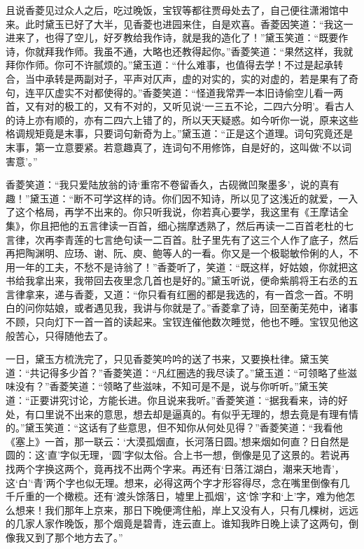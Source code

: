 且说香菱见过众人之后，吃过晚饭，宝钗等都往贾母处去了，自己便往潇湘馆中来。此时黛玉已好了大半，见香菱也进园来住，自是欢喜。香菱因笑道：“我这一进来了，也得了空儿，好歹教给我作诗，就是我的造化了！”黛玉笑道：“既要作诗，你就拜我作师。我虽不通，大略也还教得起你。”香菱笑道：“果然这样，我就拜你作师。你可不许腻烦的。”黛玉道：“什么难事，也值得去学！不过是起承转合，当中承转是两副对子，平声对仄声，虚的对实的，实的对虚的，若是果有了奇句，连平仄虚实不对都使得的。”香菱笑道：“怪道我常弄一本旧诗偷空儿看一两首，又有对的极工的，又有不对的，又听见说‘一三五不论，二四六分明’。看古人的诗上亦有顺的，亦有二四六上错了的，所以天天疑惑。如今听你一说，原来这些格调规矩竟是末事，只要词句新奇为上。”黛玉道：“正是这个道理。词句究竟还是末事，第一立意要紧。若意趣真了，连词句不用修饰，自是好的，这叫做‘不以词害意’。”

香菱笑道：“我只爱陆放翁的诗‘重帘不卷留香久，古砚微凹聚墨多’，说的真有趣！”黛玉道：“断不可学这样的诗。你们因不知诗，所以见了这浅近的就爱，一入了这个格局，再学不出来的。你只听我说，你若真心要学，我这里有《王摩诘全集》，你且把他的五言律读一百首，细心揣摩透熟了，然后再读一二百首老杜的七言律，次再李青莲的七言绝句读一二百首。肚子里先有了这三个人作了底子，然后再把陶渊明、应玚、谢、阮、庾、鲍等人的一看。你又是一个极聪敏伶俐的人，不用一年的工夫，不愁不是诗翁了！”香菱听了，笑道：“既这样，好姑娘，你就把这书给我拿出来，我带回去夜里念几首也是好的。”黛玉听说，便命紫鹃将王右丞的五言律拿来，递与香菱，又道：“你只看有红圈的都是我选的，有一首念一首。不明白的问你姑娘，或者遇见我，我讲与你就是了。”香菱拿了诗，回至蘅芜苑中，诸事不顾，只向灯下一首一首的读起来。宝钗连催他数次睡觉，他也不睡。宝钗见他这般苦心，只得随他去了。

一日，黛玉方梳洗完了，只见香菱笑吟吟的送了书来，又要换杜律。黛玉笑道：“共记得多少首？”香菱笑道：“凡红圈选的我尽读了。”黛玉道：“可领略了些滋味没有？”香菱笑道：“领略了些滋味，不知可是不是，说与你听听。”黛玉笑道：“正要讲究讨论，方能长进。你且说来我听。”香菱笑道：“据我看来，诗的好处，有口里说不出来的意思，想去却是逼真的。有似乎无理的，想去竟是有理有情的。”黛玉笑道：“这话有了些意思，但不知你从何处见得？”香菱笑道：“我看他《塞上》一首，那一联云：‘大漠孤烟直，长河落日圆。’想来烟如何直？日自然是圆的：这‘直’字似无理，‘圆’字似太俗。合上书一想，倒像是见了这景的。若说再找两个字换这两个，竟再找不出两个字来。再还有‘日落江湖白，潮来天地青’，这‘白’‘青’两个字也似无理。想来，必得这两个字才形容得尽，念在嘴里倒像有几千斤重的一个橄榄。还有‘渡头馀落日，墟里上孤烟’，这‘馀’字和‘上’字，难为他怎么想来！我们那年上京来，那日下晚便湾住船，岸上又没有人，只有几棵树，远远的几家人家作晚饭，那个烟竟是碧青，连云直上。谁知我昨日晚上读了这两句，倒像我又到了那个地方去了。”

